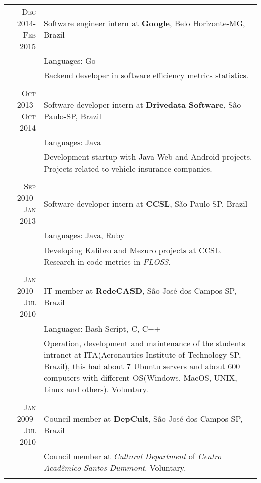 \documentclass[a4paper,10pt]{article} %
\begin{document}
\begin{tabular}{r|p{11cm}}
\textsc{Dec 2014-Feb 2015} & Software engineer intern at \textbf{Google}, Belo Horizonte-MG, Brazil \emph{}\\
& \footnotesize{Languages: Go}\\
       & \footnotesize{Backend developer in software efficiency metrics statistics.} \\
       \multicolumn{2}{c}{} \\
       

\textsc{Oct 2013-Oct 2014} & Software developer intern at \textbf{Drivedata Software}, São Paulo-SP, Brazil \emph{}\\
& \footnotesize{Languages: Java}\\
       & \footnotesize{Development startup with Java Web and Android projects. Projects related to vehicle insurance companies.} \\
       \multicolumn{2}{c}{} \\
	

\textsc{Sep 2010-Jan 2013} & Software developer intern at \textbf{CCSL}, São Paulo-SP, Brazil \emph{}\\
& \footnotesize{Languages: Java, Ruby}\\
       & \footnotesize{Developing Kalibro and Mezuro projects at CCSL. Research in code metrics in \emph{FLOSS}.}\\
\multicolumn{2}{c}{} \\


\textsc{Jan 2010-Jul 2010} & IT member at \textbf{RedeCASD}, São José dos Campos-SP, Brazil \emph{}\\
& \footnotesize{Languages: Bash Script, C, C++}\\
       & \footnotesize{Operation, development and maintenance of the students intranet at ITA(Aeronautics Institute of
       Technology-SP, Brazil), this had about 7 Ubuntu servers and about 600 computers with different
       OS(Windows, MacOS, UNIX, Linux and others). Voluntary.}\\
\multicolumn{2}{c}{} \\


\textsc{Jan 2009-Jul 2010} & Council member at \textbf{DepCult}, São José dos Campos-SP, Brazil \emph{}\\
& \footnotesize{Council member at \emph{Cultural Department} of 
       \emph{Centro Acad\^{e}mico Santos Dummont}. Voluntary.}\\
\multicolumn{2}{c}{} \\



\end{tabular}
\end{document}
